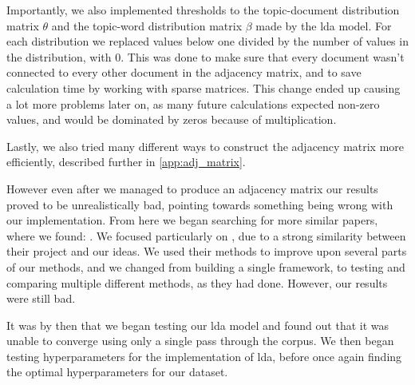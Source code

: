Importantly, we also implemented thresholds to the topic-document distribution matrix $\theta$ and the topic-word distribution matrix $\beta$ made by the \gls{lda} model.
For each distribution we replaced values below one divided by the number of values in the distribution, with 0.
This was done to make sure that every document wasn't connected to every other document in the adjacency matrix, and to save calculation time by working with sparse matrices.
This change ended up causing a lot more problems later on, as many future calculations expected non-zero values, and would be dominated by zeros because of multiplication.

Lastly, we also tried many different ways to construct the adjacency matrix more efficiently, described further in \autoref{app:adj_matrix}.

However even after we managed to produce an adjacency matrix our results proved to be unrealistically bad, pointing towards something being wrong with our implementation.
From here we began searching for more similar papers, where we found: .
We focused particularly on , due to a strong similarity between their project and our ideas.
We used their methods to improve upon several parts of our methods, and we changed from building a single framework, to testing and comparing multiple different methods, as they had done.
However, our results were still bad.

It was by then that we began testing our \gls{lda} model and found out that it was unable to converge using only a single pass through the corpus. 
We then began testing hyperparameters for the implementation of \gls{lda}, before once again finding the optimal hyperparameters for our dataset.
